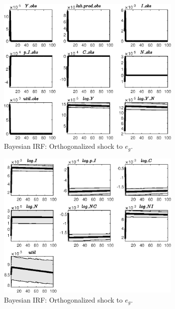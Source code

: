  
\begin{figure}[H]
\centering 
\includegraphics[width=0.80\textwidth]{BRS_imp_mobility/Output/BRS_imp_mobility_Bayesian_IRF_e_g_1}
\caption{Bayesian IRF: Orthogonalized shock to ${e_g}$.}
\label{Fig:BayesianIRF:e_g:1}
\end{figure}
 
\begin{figure}[H]
\centering 
\includegraphics[width=0.80\textwidth]{BRS_imp_mobility/Output/BRS_imp_mobility_Bayesian_IRF_e_g_2}
\caption{Bayesian IRF: Orthogonalized shock to ${e_g}$.}
\label{Fig:BayesianIRF:e_g:2}
\end{figure}
 
